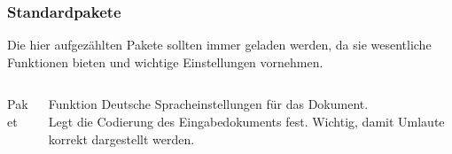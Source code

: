 \begin{frame}[fragile]
    \frametitle{Standardpakete}
    Die hier aufgezählten Pakete sollten immer geladen werden, da sie wesentliche Funktionen bieten und wichtige Einstellungen vornehmen.
    \begin{columns}[T]
        \begin{column}{0.47\textwidth}
            \begin{block}{Paket}
                \begin{lstverbatim}
                \usepackage[ngerman]{babel}

                \usepackage[utf8]{luainputenc}
                \end{lstverbatim}
            \end{block}
        \end{column}
        \begin{column}{0.47\textwidth}
            \begin{block}{Funktion}
                Deutsche Spracheinstellungen für das Dokument. \\
                Legt die Codierung des Eingabedokuments fest. Wichtig, damit Umlaute korrekt dargestellt werden.

            \end{block}
        \end{column}
    \end{columns}
\end{frame}

